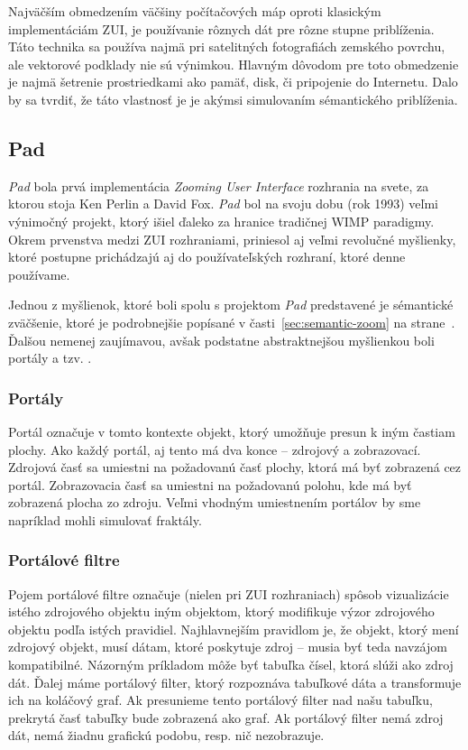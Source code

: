 Najväčším obmedzením väčšiny počítačových máp oproti klasickým implementáciám ZUI, je používanie rôznych dát pre rôzne stupne priblíženia. Táto technika sa používa najmä pri satelitných fotografiách zemského povrchu, ale vektorové podklady nie sú výnimkou. Hlavným dôvodom pre toto obmedzenie je najmä šetrenie prostriedkami ako pamäť, disk, či pripojenie do Internetu. Dalo by sa tvrdiť, že táto vlastnosť je je akýmsi simulovaním sémantického priblíženia.

\subsection{Pad} \label{sec:pad}

\textit{Pad} \cite{pad} bola prvá implementácia \textit{Zooming User Interface} rozhrania na svete, za ktorou stoja Ken Perlin a David Fox. \textit{Pad} bol na svoju dobu (rok 1993) veľmi výnimočný projekt, ktorý išiel ďaleko za hranice tradičnej WIMP paradigmy. Okrem prvenstva medzi ZUI rozhraniami, priniesol aj veľmi revolučné myšlienky, ktoré postupne prichádzajú aj do používateľských rozhraní, ktoré denne používame.

Jednou z myšlienok, ktoré boli spolu s projektom \textit{Pad} predstavené je sémantické zväčšenie, ktoré je podrobnejšie popísané v časti~\ref{sec:semantic-zoom}  na strane~\pageref{sec:semantic-zoom}. Ďalšou nemenej zaujímavou, avšak podstatne abstraktnejšou myšlienkou boli portály a tzv. .

\subsubsection{Portály}

Portál označuje v tomto kontexte objekt, ktorý umožňuje presun k iným častiam plochy. Ako každý portál, aj tento má dva konce -- zdrojový a zobrazovací. Zdrojová časť sa umiestni na požadovanú časť plochy, ktorá má byť zobrazená cez portál. Zobrazovacia časť sa umiestni na požadovanú polohu, kde má byť zobrazená plocha zo zdroju. Veľmi vhodným umiestnením portálov by sme napríklad mohli simulovať fraktály.

\subsubsection{Portálové filtre}

Pojem portálové filtre označuje (nielen pri ZUI rozhraniach) spôsob vizualizácie istého zdrojového objektu iným objektom, ktorý modifikuje výzor zdrojového objektu podľa istých pravidiel. Najhlavnejším pravidlom je, že objekt, ktorý mení zdrojový objekt, musí  dátam, ktoré poskytuje zdroj -- musia byť teda navzájom kompatibilné. Názorným príkladom môže byť tabuľka čísel, ktorá slúži ako zdroj dát. Ďalej máme portálový filter, ktorý rozpoznáva tabuľkové dáta a transformuje ich na koláčový graf. Ak presunieme tento portálový filter nad našu tabuľku, prekrytá časť tabuľky bude zobrazená ako graf. Ak portálový filter nemá zdroj dát, nemá žiadnu grafickú podobu, resp. nič nezobrazuje.

